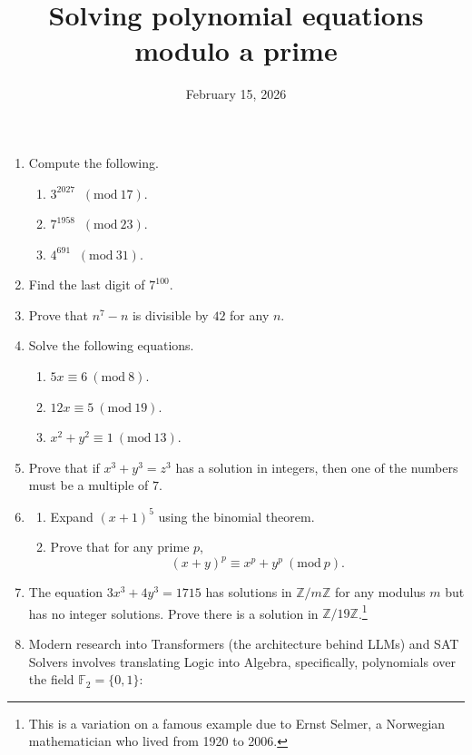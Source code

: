 \documentclass[12pt]{article}
\title{Solving polynomial equations modulo a prime}
\date{February 15, 2026}
\newcommand{\Mod}[1]{\ (\mathrm{mod}\ #1)}
\newcommand{\field}[1]{\mathbb{#1}}  %
\newcommand{\Z}{\field{Z}} %
\newcommand{\F}{\field{F}}
\begin{document}
\maketitle

\begin{enumerate}

\item Compute the following.
\begin{enumerate}
  \item[(a)] $3^{2027}$ $\Mod{17}$.
  \item[(b)] $7^{1958}$ $\Mod{23}$.
  \item[(c)] $4^{691}$ $\Mod{31}$.
\end{enumerate}


\item Find the last digit of $7^{100}$.

\item Prove that $n^7 - n$ is divisible by $42$ for any $n$.

\item Solve the following equations.
\begin{enumerate}
  \item[(a)] $5x \equiv 6 \Mod{8}$.
  \item[(b)] $12x \equiv 5 \Mod{19}$.
  \item[(c)] $x^2 + y^2 \equiv 1 \Mod{13}$.
\end{enumerate}

\item Prove that if $x^3 + y^3 = z^3$ has a solution in integers, then one of the numbers must be a multiple of $7$.

\item \begin{enumerate}
  \item[(a)] Expand $(x+1)^5$ using the binomial theorem.
  \item[(b)] Prove that for any prime $p$, \[ (x+y)^p \equiv x^p + y^p \Mod{p}.\]
\end{enumerate}

\item The equation $3x^3 + 4y^3 = 1715$ has solutions in $\Z/m\Z$ for any modulus $m$ but has no integer solutions. Prove there is a solution in $\Z/19\Z$.\footnote{This is a variation on a famous example due to Ernst Selmer, a Norwegian mathematician who lived from 1920 to 2006.} 

\item Modern research into Transformers (the architecture behind LLMs) and SAT Solvers involves translating Logic into Algebra, specifically, polynomials over the field $\F_2=\{0,1\}$:


\end{enumerate}
\end{document}
